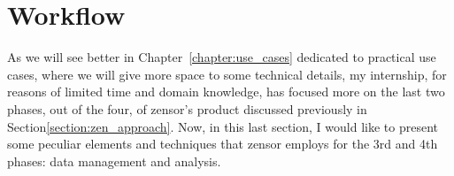 \section{Workflow}\label{section:workflow}
As we will see better in Chapter~\ref{chapter:use_cases} dedicated to practical use cases, where we will give more space to some technical details, 
my internship, for reasons of limited time and domain knowledge, has focused more on the last two phases, out of the four, of zensor's product discussed previously in Section\ref{section:zen_approach}. 
Now, in this last section, I would like to present some peculiar elements and techniques that zensor employs for the 3rd and 4th phases: data management and analysis.

